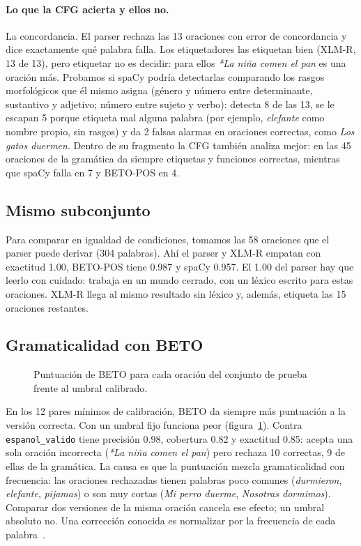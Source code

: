 \paragraph{Lo que la CFG acierta y ellos no.} La concordancia. El parser rechaza las 13
oraciones con error de concordancia y dice exactamente qué palabra falla. Los etiquetadores las
etiquetan bien (XLM-R, 13 de 13), pero etiquetar no es decidir: para ellos
\emph{*La niña comen el pan} es una oración más. Probamos si spaCy podría detectarlas comparando
los rasgos morfológicos que él mismo asigna (género y número entre determinante, sustantivo y
adjetivo; número entre sujeto y verbo): detecta 8 de las 13, se le escapan 5 porque etiqueta mal
alguna palabra (por ejemplo, \emph{elefante} como nombre propio, sin rasgos) y da 2 falsas
alarmas en oraciones correctas, como \emph{Los gatos duermen}. Dentro de su fragmento la CFG
también analiza mejor: en las 45 oraciones de la gramática da siempre etiquetas y funciones
correctas, mientras que spaCy falla en 7 y BETO-POS en 4.

\subsection{Mismo subconjunto}

Para comparar en igualdad de condiciones, tomamos las 58 oraciones que el parser puede derivar
(304 palabras). Ahí el parser y XLM-R empatan con exactitud 1.00, BETO-POS tiene 0.987 y spaCy
0.957. El 1.00 del parser hay que leerlo con cuidado: trabaja en un mundo cerrado, con un léxico
escrito para estas oraciones. XLM-R llega al mismo resultado sin léxico y, además, etiqueta las
15 oraciones restantes.

\subsection{Gramaticalidad con BETO}

\begin{figure}[h]
  \centering
  \caption{Puntuación de BETO para cada oración del conjunto de prueba frente al umbral
    calibrado.}
  \label{fig:pll}
\end{figure}

En los 12 pares mínimos de calibración, BETO da siempre más puntuación a la versión correcta.
Con un umbral fijo funciona peor (figura~\ref{fig:pll}). Contra \texttt{espanol\_valido} tiene
precisión 0.98, cobertura 0.82 y exactitud 0.85: acepta una sola oración incorrecta
(\emph{*La niña comen el pan}) pero rechaza 10 correctas, 9 de ellas de la gramática. La causa
es que la puntuación mezcla gramaticalidad con frecuencia: las oraciones rechazadas tienen
palabras poco comunes (\emph{durmieron}, \emph{elefante}, \emph{pijamas}) o son muy cortas
(\emph{Mi perro duerme}, \emph{Nosotras dormimos}). Comparar dos versiones de la misma oración
cancela ese efecto; un umbral absoluto no. Una corrección conocida es normalizar por la
frecuencia de cada palabra~\cite{lau}.

